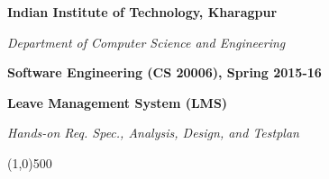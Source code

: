 \documentclass{article}
\begin{document}
\thispagestyle{plain}
\begin{center}
{\huge {\bf Indian Institute of Technology, Kharagpur}} 

{\LARGE {\em Department of Computer Science and Engineering}}
\vspace{0.4cm}

{\Large \bf Software Engineering (CS 20006), Spring 2015-16} \vspace{0.1cm}

{\large \bf Leave Management System (LMS)} \vspace{0.1cm}

{\large \em Hands-on Req. Spec., Analysis, Design, and Testplan} %

\end{center}
\date{}


\line(1,0){500}
\end{document}
